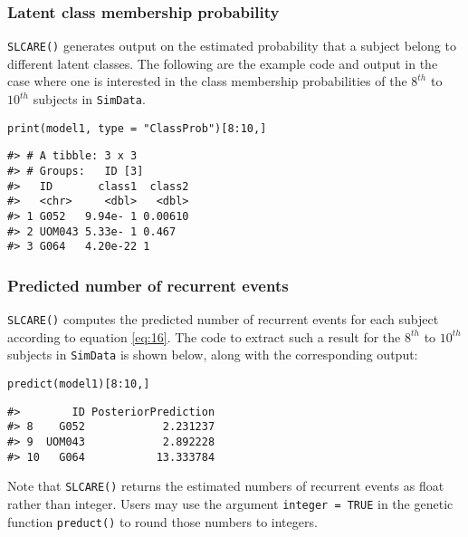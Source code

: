 \hypertarget{latent-class-membership-probability}{%
\subsubsection{Latent class membership probability}\label{latent-class-membership-probability}}

\texttt{SLCARE()} generates output on the estimated probability that a subject belong to different latent classes. The following are the example code and output in the case where one is interested in the class membership probabilities of the \(8^{th}\) to \(10^{th}\) subjects in \texttt{SimData}.

\begin{verbatim}
print(model1, type = "ClassProb")[8:10,]
\end{verbatim}

\begin{verbatim}
#> # A tibble: 3 x 3
#> # Groups:   ID [3]
#>   ID       class1  class2
#>   <chr>     <dbl>   <dbl>
#> 1 G052   9.94e- 1 0.00610
#> 2 UOM043 5.33e- 1 0.467  
#> 3 G064   4.20e-22 1
\end{verbatim}

\hypertarget{predicted-number-of-recurrent-events}{%
\subsubsection{Predicted number of recurrent events}\label{predicted-number-of-recurrent-events}}

\texttt{SLCARE()} computes the predicted number of recurrent events for each subject according to equation \eqref{eq:16}. The code to extract such a result for the \(8^{th}\) to \(10^{th}\) subjects in \texttt{SimData} is shown below, along with the corresponding output:

\begin{verbatim}
predict(model1)[8:10,]
\end{verbatim}

\begin{verbatim}
#>        ID PosteriorPrediction
#> 8    G052            2.231237
#> 9  UOM043            2.892228
#> 10   G064           13.333784
\end{verbatim}

Note that \texttt{SLCARE()} returns the estimated numbers of recurrent
events as float rather than integer. Users may use the argument \texttt{integer\ =\ TRUE} in the genetic function \texttt{preduct()} to round those numbers to integers.

